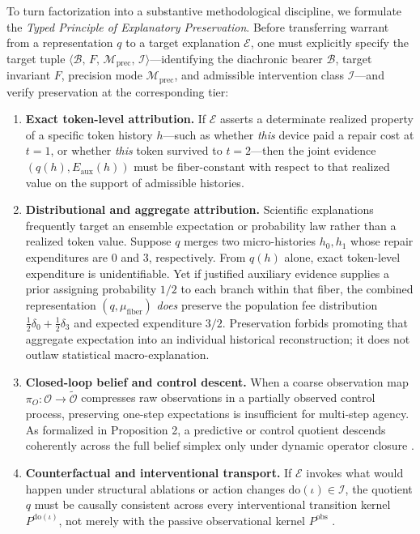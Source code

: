 \documentclass[11pt,a4paper]{article}
\providecommand{\tightlist}{\setlength{\itemsep}{2pt}\setlength{\parskip}{0pt}}
\begin{document}
To turn factorization into a substantive methodological discipline, we
formulate the \emph{Typed Principle of Explanatory Preservation}. Before
transferring warrant from a representation \(q\) to a target explanation
\(\mathcal{E}\), one must explicitly specify the target tuple
\(\langle \mathcal{B},\, F,\, \mathcal{M}_{\mathrm{prec}},\, \mathcal{I}\rangle\)---identifying
the diachronic bearer \(\mathcal{B}\), target invariant \(F\), precision
mode \(\mathcal{M}_{\mathrm{prec}}\), and admissible intervention class
\(\mathcal{I}\)---and verify preservation at the corresponding tier:

\begin{enumerate}
\def\labelenumi{\arabic{enumi}.}
\tightlist
\item
  \textbf{Exact token-level attribution.} If \(\mathcal{E}\) asserts a
  determinate realized property of a specific token history \(h\)---such
  as whether \emph{this} device paid a repair cost at \(t=1\), or
  whether \emph{this} token survived to \(t=2\)---then the joint
  evidence \((q(h), E_{\mathrm{aux}}(h))\) must be fiber-constant with
  respect to that realized value on the support of admissible histories.
\item
  \textbf{Distributional and aggregate attribution.} Scientific
  explanations frequently target an ensemble expectation or probability
  law rather than a realized token value. Suppose \(q\) merges two
  micro-histories \(h_0, h_1\) whose repair expenditures are \(0\) and
  \(3\), respectively. From \(q(h)\) alone, exact token-level
  expenditure is unidentifiable. Yet if justified auxiliary evidence
  supplies a prior assigning probability \(1/2\) to each branch within
  that fiber, the combined representation \((q, \mu_{\text{fiber}})\)
  \emph{does} preserve the population fee distribution
  \(\frac{1}{2}\delta_0 + \frac{1}{2}\delta_3\) and expected expenditure
  \(3/2\). Preservation forbids promoting that aggregate expectation
  into an individual historical reconstruction; it does not outlaw
  statistical macro-explanation.
\item
  \textbf{Closed-loop belief and control descent.} When a coarse
  observation map \(\pi_O: \mathcal{O} \to \widetilde{\mathcal{O}}\)
  compresses raw observations in a partially observed control process,
  preserving one-step expectations is insufficient for multi-step
  agency. As formalized in Proposition 2, a predictive or control
  quotient descends coherently across the full belief simplex only under
  dynamic operator closure
  \citep{burkeRosenblatt1958, kemenySnell1960, poupartBoutilier2003, givanDeanGreig2003}.
\item
  \textbf{Counterfactual and interventional transport.} If
  \(\mathcal{E}\) invokes what would happen under structural ablations
  or action changes \(\mathrm{do}(\iota) \in \mathcal{I}\), the quotient
  \(q\) must be causally consistent across every interventional
  transition kernel \(P^{\mathrm{do}(\iota)}\), not merely with the
  passive observational kernel \(P^{\mathrm{obs}}\)
  \citep{pearl2009, woodward2000, rubenstein2017}.
\end{enumerate}
\end{document}
